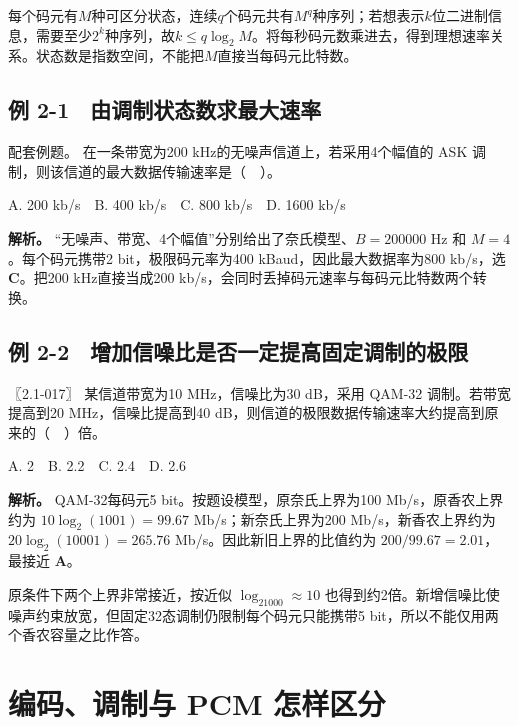 每个码元有\(M\)种可区分状态，连续\(q\)个码元共有\(M^q\)种序列；若想表示\(k\)位二进制信息，需要至少\(2^k\)种序列，故\(k\le q\log_2M\)。将每秒码元数乘进去，得到理想速率关系。状态数是指数空间，不能把\(M\)直接当每码元比特数。

\subsection{例 2-1　由调制状态数求最大速率}\label{CN02-ex1}

\begin{example}[配套例题]

配套例题。 在一条带宽为200 kHz的无噪声信道上，若采用4个幅值的 ASK 调制，则该信道的最大数据传输速率是（　）。

A. 200 kb/s　B. 400 kb/s　C. 800 kb/s　D. 1600 kb/s

\end{example}

\textbf{解析。} ``无噪声、带宽、4个幅值''分别给出了奈氏模型、\(B=200000\) Hz 和 \(M=4\)。每个码元携带2 bit，极限码元率为400 kBaud，因此最大数据率为800 kb/s，选 \textbf{C}。把200 kHz直接当成200 kb/s，会同时丢掉码元速率与每码元比特数两个转换。

\subsection{例 2-2　增加信噪比是否一定提高固定调制的极限}\label{CN02-ex2}

\begin{example}[配套例题]

〖2.1-017〗 某信道带宽为10 MHz，信噪比为30 dB，采用 QAM-32 调制。若带宽提高到20 MHz，信噪比提高到40 dB，则信道的极限数据传输速率大约提高到原来的（　）倍。

A. 2　B. 2.2　C. 2.4　D. 2.6

\end{example}

\textbf{解析。} QAM-32每码元5 bit。按题设模型，原奈氏上界为100 Mb/s，原香农上界约为 \(10\log_2(1001)=99.67\) Mb/s；新奈氏上界为200 Mb/s，新香农上界约为 \(20\log_2(10001)=265.76\) Mb/s。因此新旧上界的比值约为 \(200/99.67=2.01\)，最接近 \textbf{A}。

原条件下两个上界非常接近，按近似 \(\log_21000\approx10\) 也得到约2倍。新增信噪比使噪声约束放宽，但固定32态调制仍限制每个码元只能携带5 bit，所以不能仅用两个香农容量之比作答。

\section{编码、调制与 PCM 怎样区分}\label{CN02-03}

